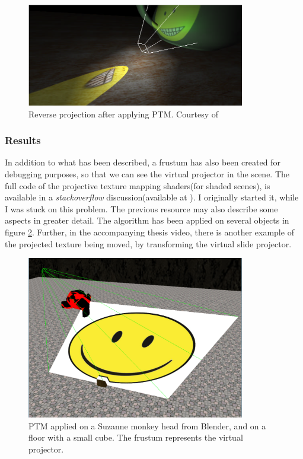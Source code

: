 \documentclass[]{article}
\begin{document}
\begin{figure}[hbtp]
    \centering
    \includegraphics[width=0.85\textwidth]{figures/ReverseProjecton.PNG}
    \caption{Reverse projection after applying PTM. Courtesy of \cite{cassNvidia}}
    \label{fig:ReverseProjection}
\end{figure}

\subsubsection{Results}

In addition to what has been described, a frustum has also been created for debugging purposes, so that we can see the virtual projector in the scene. The full code of the projective texture mapping shaders(for shaded scenes), is available in a \textit{stackoverflow} discussion(available at \cite{avram2014}). I originally started it, while I was stuck on this problem. The previous resource may also describe some aspects in greater detail. The algorithm has been applied on several objects in figure \ref{fig:PTMTest}. Further, in the accompanying thesis video, there is another example of the projected texture being moved, by transforming the virtual slide projector.

\begin{figure}[hbtp]
    \centering
    \includegraphics[width=0.85\textwidth]{figures/PTMTest.png}
    \caption{PTM applied on a Suzanne monkey head from Blender, and on a floor with a small cube. The frustum represents the virtual projector.}
    \label{fig:PTMTest}
\end{figure}
\end{document}
